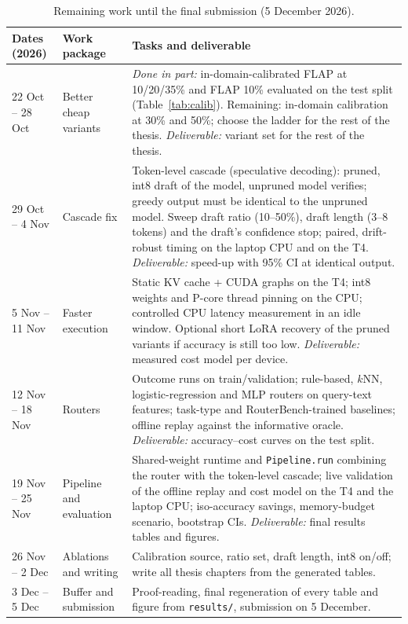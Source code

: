 \documentclass[11pt,a4paper]{article}
\begin{document}
\begin{table}[!htbp]
\centering\small
\begin{tabular}{p{2.6cm}p{2.3cm}p{9.6cm}}
\toprule
Dates (2026) & Work package & Tasks and deliverable \\
\midrule
22 Oct -- 28 Oct & Better cheap variants &
\emph{Done in part:} in-domain-calibrated FLAP at 10/20/35\% and FLAP 10\% evaluated on the test split
(Table~\ref{tab:calib}). Remaining: in-domain calibration at 30\% and 50\%; choose the ladder for the rest of the thesis.
\emph{Deliverable:} variant set for the rest of the thesis. \\
29 Oct -- 4 Nov & Cascade fix &
Token-level cascade (speculative decoding): pruned, int8 draft of the model, unpruned model verifies; greedy output
must be identical to the unpruned model. Sweep draft ratio (10--50\%), draft length (3--8 tokens) and the draft's
confidence stop; paired, drift-robust timing on the laptop CPU and on the T4.
\emph{Deliverable:} speed-up with 95\% CI at identical output. \\
5 Nov -- 11 Nov & Faster execution &
Static KV cache + CUDA graphs on the T4; int8 weights and P-core thread pinning on the CPU; controlled CPU latency
measurement in an idle window. Optional short LoRA recovery of the pruned variants if accuracy is still too low.
\emph{Deliverable:} measured cost model per device. \\
12 Nov -- 18 Nov & Routers &
Outcome runs on train/validation; rule-based, $k$NN, logistic-regression and MLP routers on query-text features;
task-type and RouterBench-trained baselines; offline replay against the informative oracle.
\emph{Deliverable:} accuracy--cost curves on the test split. \\
19 Nov -- 25 Nov & Pipeline and evaluation &
Shared-weight runtime and \texttt{Pipeline.run} combining the router with the token-level cascade; live validation of
the offline replay and cost model on the T4 and the laptop CPU; iso-accuracy savings, memory-budget scenario,
bootstrap CIs. \emph{Deliverable:} final results tables and figures. \\
26 Nov -- 2 Dec & Ablations and writing &
Calibration source, ratio set, draft length, int8 on/off; write all thesis chapters from the generated tables. \\
3 Dec -- 5 Dec & Buffer and submission &
Proof-reading, final regeneration of every table and figure from \texttt{results/}, submission on 5 December. \\
\bottomrule
\end{tabular}
\caption{Remaining work until the final submission (5 December 2026).}
\end{table}
\end{document}
